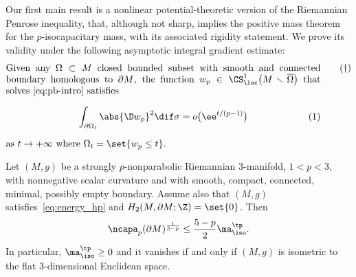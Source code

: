 Our first main result is a nonlinear potential-theoretic version of the Riemannian Penrose inequality, that, although not sharp, implies the positive mass theorem for the $p$-isocapacitary mass, with its associated rigidity statement. We prove its validity under the following asymptotic integral gradient estimate:
\bgroup\leqnmode
\begin{equation*}
\begin{minipage}[t]{.9585\textwidth}%
Given any $\Omega \subset M$ closed bounded subset with smooth and connected boundary homologous to $\partial M$, the function $w_p\in \CS^1_{\loc}\big(M \smallsetminus \overline{\Omega}\big)$ that solves~\eqref{eq:pb-intro} satisfies
\begin{gather*}
\int_{\partial \Omega_t} \abs{ \D w_p}^2 \dif \sigma = o\bigl(\ee^{t/(p-1)}\bigr)
\end{gather*}
as $t \to +\infty$ where $\Omega_t= \set{ w_p \leq t}$.
\end{minipage}\tag{$\dag$}\label{eq:energy_hp}
\end{equation*}
\egroup

\begin{Theorem}
\label{thm:pmt-intro}
 Let $(M,g)$ be a strongly $p$-nonparabolic Riemannian $3$-manifold, $1<p<3$, with nonnegative scalar curvature and with smooth, compact, connected, minimal, possibly empty boundary. Assume also that $(M,g)$ satisfies~\eqref{eq:energy_hp} and $H_2( M, \partial M; \Z)=\set{0}$. Then
 \begin{equation}
\label{eq:p-penroseintro-crociata}
\ncapa_p(\partial M)^{\frac{1}{3-p}}\leq \frac{5-p}{2}\ma^{\tp}_{\iso}.
\end{equation}
In particular, $\ma^{\tp}_{\iso}\geq 0$ and it vanishes if and only if $(M,g)$ is isometric to the flat $3$-dimensional Euclidean space.
\end{Theorem}
